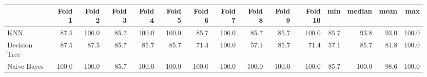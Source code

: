 \begin{tabular}{lrrrrrrrrrrrrrr}
\toprule
{} & Fold 1 & Fold 2 & Fold 3 & Fold 4 & Fold 5 & Fold 6 & Fold 7 & Fold 8 & Fold 9 & Fold 10 &   min & median &  mean &    max \\
\midrule
KNN           & 87.5 & 100.0 & 85.7 & 100.0 & 100.0 & 85.7 & 100.0 & 85.7 & 85.7 & 100.0 & 85.7 & 93.8 & 93.0 & 100.0 \\
Decision Tree & 87.5 & 87.5 & 85.7 & 85.7 & 85.7 & 71.4 & 100.0 & 57.1 & 85.7 & 71.4 & 57.1 & 85.7 & 81.8 & 100.0 \\
Naive Bayes   & 100.0 & 100.0 & 85.7 & 100.0 & 100.0 & 100.0 & 100.0 & 100.0 & 100.0 & 100.0 & 85.7 & 100.0 & 98.6 & 100.0 \\
\bottomrule
\end{tabular}


